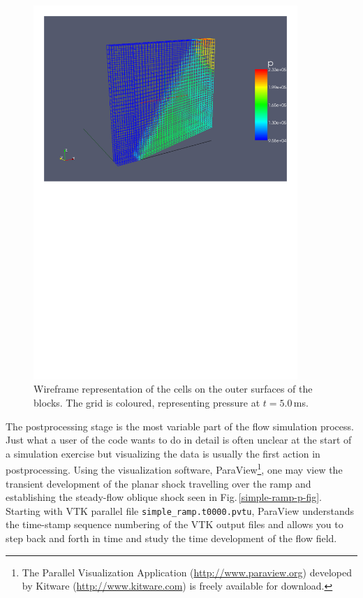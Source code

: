 \begin{figure}[htbp]
\begin{center}
\includegraphics[width=10cm,viewport=27 444 571 818]{../3D/simple_ramp/simple-ramp-wire-frame-p.pdf}
\end{center}
\caption{Wireframe representation of the cells on the outer surfaces of the blocks.
  The grid is coloured, representing pressure at $t = 5.0$\,ms.}
\label{simple-ramp-wireframe-fig}
\end{figure}

\medskip
The postprocessing stage is the most variable part of the flow simulation
process.
Just what a user of the code wants to do in detail is often unclear at the
start of a simulation exercise but visualizing the data is usually the first
action in postprocessing.
Using the visualization software, ParaView\footnote{The Parallel Visualization
  Application (\url{http://www.paraview.org}) developed by Kitware
  (\url{http://www.kitware.com}) is freely available for download.},
one may view the transient development of the planar shock travelling over the
ramp and establishing the steady-flow oblique shock seen in
Fig.\,\ref{simple-ramp-p-fig}.
Starting with VTK parallel file \texttt{simple\_ramp.t0000.pvtu}, 
ParaView understands the time-stamp sequence
numbering of the VTK output files and allows you to step back and forth in
time and study the time development of the flow field.

